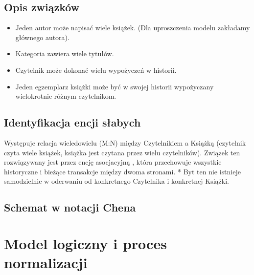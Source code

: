 \documentclass[letterpaper,10pt,english]{sphinxmanual}
\begin{document}
\subsection{Opis związków}
\label{\detokenize{rozdzial_3/index:opis-zwiazkow}}\begin{itemize}
\item {} 
\sphinxAtStartPar
{} Jeden autor może napisać wiele książek. (Dla uproszczenia modelu zakładamy głównego autora).

\item {} 
\sphinxAtStartPar
{} Kategoria zawiera wiele tytułów.

\item {} 
\sphinxAtStartPar
{} Czytelnik może dokonać wielu wypożyczeń w historii.

\item {} 
\sphinxAtStartPar
{} Jeden egzemplarz książki może być w swojej historii wypożyczany wielokrotnie różnym czytelnikom.

\end{itemize}


\subsection{Identyfikacja encji słabych}
\label{\detokenize{rozdzial_3/index:identyfikacja-encji-slabych}}
\sphinxAtStartPar
Występuje relacja wiele\sphinxhyphen{}do\sphinxhyphen{}wielu (M:N) między Czytelnikiem a Książką (czytelnik czyta wiele książek, książka jest czytana przez wielu czytelników). Związek ten rozwiązywany jest przez encję asocjacyjną , która przechowuje wszystkie historyczne i bieżące transakcje między dwoma stronami.
*  Byt ten nie istnieje samodzielnie w oderwaniu od konkretnego Czytelnika i konkretnej Książki.


\subsection{Schemat w notacji Chena}
\label{\detokenize{rozdzial_3/index:schemat-w-notacji-chena}}
\noindent{}


\section{Model logiczny i proces normalizacji}
\label{\detokenize{rozdzial_3/index:model-logiczny-i-proces-normalizacji}}
\end{document}
